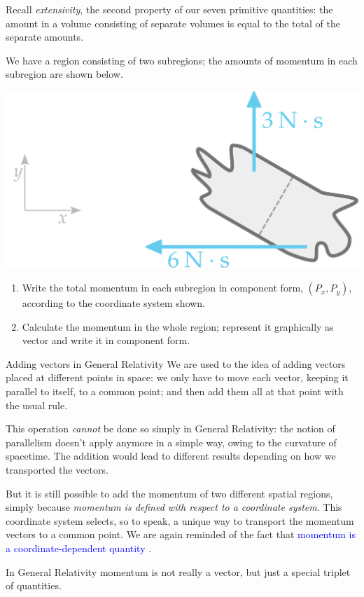 \documentclass[a4paper,12pt,%
onecolumn,oneside,%
british%
]{memoir}
\renewcommand*{\|}[1][]{\nonscript\:#1\vert\nonscript\:\mathopen{}}
\newcommand*{\sect}{\S}%
\renewcommand*{\autoref}[3][\sect\,\ref]{\textcolor{blue}{#3}
\raisebox{0.6ex}{\color{blue}\miniscule%
\faIcon{angle-right}%
\;#1{#2}\;p.\,\pageref{#2}}}
\begin{document}
\bigskip


\begin{exercise}
  Recall \emph{extensivity}, the second property of our seven primitive quantities: the amount in a volume consisting of separate volumes is equal to the total of the separate amounts.

We have a region consisting of two subregions; the amounts of momentum in each subregion are shown below.
  \begin{center}
    \includegraphics[width=0.5\linewidth]{images/exercise_momentumsum.pdf}
  \end{center}
  \begin{enumerate}[exerc]
  \item Write the total momentum in each subregion in component form, $(P_{x}, P_{y})$, according to the coordinate system shown.
  \item Calculate the momentum in the whole region; represent it graphically as vector and write it in component form.
  \end{enumerate}
\end{exercise}

\begin{extra}{Adding vectors in General Relativity}
  We are used to the idea of adding vectors placed at different points in space: we only have to move each vector, keeping it parallel to itself, to a common point; and then add them all at that point with the usual rule.

  This operation \emph{cannot} be done so simply in General Relativity: the notion of parallelism doesn't apply anymore in a simple way, owing to the curvature of spacetime. The addition would lead to different results depending on how we transported the vectors.

  But it is still possible to add the momentum of two different spatial regions, simply because \emph{momentum is defined with respect to a coordinate system}. This coordinate system selects, so to speak, a unique way to transport the momentum vectors to a common point. We are again reminded of the fact that \autoref{sec:energy_momentum_angmomentum_coords}{momentum is a coordinate-dependent quantity}.

  In General Relativity momentum is not really a vector, but just a special triplet of quantities.

\end{extra}
\end{document}
